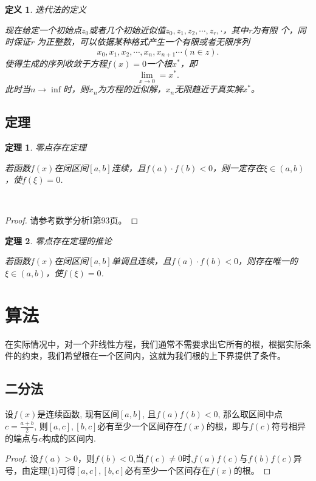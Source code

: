 \documentclass{ctexart}
\newtheorem{theorem}{定理}
\newtheorem{definition}{定义}
\begin{document}
\begin{definition}
    迭代法的定义
    \par 现在给定一个初始点$z_0$或者几个初始近似值$z_0,z_1,z_2,\cdots,z_r,\cdot$，其中r为有限
个，同时保证r 为正整数，可以依据某种格式产生一个有限或者无限序列
    \begin{equation}
        x_0,x_1,x_2,\cdots,x_n,x_{n+1} \cdots (n \in z).
    \end{equation}
使得生成的序列收敛于方程$f(x)=0$一个根$x^*$，即
    \begin{equation}
        \displaystyle \lim_{x \to 0}=x^*.
    \end{equation}
此时当$n\rightarrow\inf$时，则$x_n$为方程的近似解，$x_n$无限趋近于真实解$x^*$。
\end{definition}

\subsection{定理}
\begin{theorem}
零点存在定理
\par 若函数$f(x)$在闭区间$[a,b]$连续，且$f(a) \cdot f(b)<0$，则一定存在$\xi\in(a,b)$，使$f(\xi)=0$.
\end{theorem}
\
\begin{proof}
请参考数学分析I第93页。
\end{proof}

\begin{theorem}
    零点存在定理的推论
\par 若函数$f(x)$在闭区间$[a,b]$单调且连续，且$f(a) \cdot f(b)<0$，则存在唯一的$\xi\in(a,b)$，使$f(\xi)=0$.
\end{theorem}

\section{算法}
在实际情况中，对一个非线性方程，我们通常不需要求出它所有的根，根据实际条件的约束，我们希望根在一个区间内，这就为我们根的上下界提供了条件。
\subsection{二分法}
设$f(x)$是连续函数, 现有区间$[a, b]$, 且$f(a)f(b) < 0$, 那么取区间中点$c = \frac{a+b}{2}$, 则$[a, c], [b, c]$必有至少一个区间存在$f(x)$的根，即与$f(c)$符号相异的端点与$c$构成的区间内.
\begin{proof}
    设$f(a)>0$，则$f(b)<0$,当$f(c) \neq 0$时,$f(a)f(c)$与$f(b)f(c)$异号，由定理(1)可得$[a, c], [b, c]$必有至少一个区间存在$f(x)$的根。
\end{proof}
\end{document}
